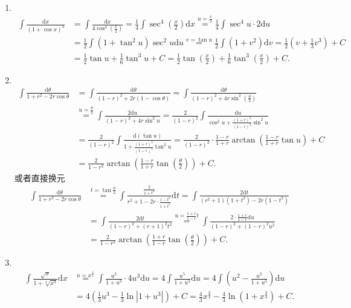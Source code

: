 \begin{solution}
\begin{enumerate}
    \item[35.]\\
    \[
    \begin{aligned}
    \int\frac{\mathrm{d}x}{(1+\cos{x})^2}&=\int\frac{\mathrm{d}x}{4\cos^4{\left(\frac{x}{2}\right)}}=\frac{1}{4}\int\sec^4{\left(\frac{x}{2}\right)}\mathrm{d}x\overset{u=\frac{x}{2}}{=}\frac{1}{4}\int\sec^4{u}\cdot2\mathrm{d}u\\
    &=\frac{1}{2}\int(1+\tan^2{u})\sec^2{u}\mathrm{d}u\overset{v=\tan{u}}{=}\frac{1}{2}\int(1+v^2)\mathrm{d}v=\frac{1}{2}\left(v+\frac{1}{3}v^3\right)+C\\
    &=\frac{1}{2}\tan{u}+\frac{1}{6}\tan^3{u}+C=\frac{1}{2}\tan\left(\frac{x}{2}\right)+\frac{1}{6}\tan^3{\left(\frac{x}{2}\right)}+C.
    \end{aligned}
    \]

    \item[36.]\\
    \[
    \begin{aligned}
    \int\frac{\mathrm{d}\theta}{1+r^2-2r\cos\theta}&=\int\frac{\mathrm{d}\theta}{(1-r)^2+2r(1-\cos\theta)}=\int\frac{\mathrm{d}\theta}{(1-r)^2+4r\sin^2\left(\frac{\theta}{2}\right)}\\
    &\overset{u=\frac{\theta}{2}}{=}\int\frac{2\mathrm{d}u}{(1-r)^2+4r\sin^2{u}}=\frac{2}{(1-r)^2}\int\frac{\mathrm{d}u}{\cos^2{u}+\frac{(1+r)^2}{(1-r)^2}\sin^2u}\\
    &=\frac{2}{(1-r)^2}\int\frac{\mathrm{d}(\tan{u})}{1+\frac{(1+r)^2}{(1-r)^2}\tan^2{u}}=\frac{2}{(1-r)^2}\cdot\frac{1-r}{1+r}\arctan\left(\frac{1-r}{1+r}\tan{u}\right)+C\\
    &=\frac{2}{1-r^2}\arctan\left(\frac{1-r}{1+r}\tan\left(\frac{\theta}{2}\right)\right)+C.
    \end{aligned}
    \]
    或者直接换元
    \[
    \begin{aligned}
    \int\frac{\mathrm{d}\theta}{1+r^2-2r\cos\theta}
    &\overset{t=\tan\frac{\theta}{2}}{=}\int\frac{\frac{2}{1+t^2}}{r^2+1-2r\cdot\frac{1-t^2}{1+t^2}}\mathrm{d}t=\int\frac{2\mathrm{d}t}{(r^2+1)(1+t^2)-2r(1-t^2)}\\
    &=\int\frac{2\mathrm{d}t}{(1-r)^2+(r+1)^2t^2}\overset{u=\frac{1+r}{1-r}t}{=}\int\frac{2\cdot\frac{1+r}{1-r}\mathrm{d}u}{(1-r)^2+(1-r)^2u^2}\\
    &=\frac{2}{1-r^2}\arctan\left( \frac{1+r}{1-r}\tan\left( \frac{\theta}{2} \right) \right)+C.
    \end{aligned}
    \]
    
    \item[37.]\\
    \[
    \begin{aligned}
    \int\frac{\sqrt{x}}{1+\sqrt[4]{x^3}}\mathrm{d}x&\overset{u=x^{\frac{1}{4}}}{=}	\int\frac{u^2}{1+u^3}\cdot4u^3\mathrm{d}u=4\int\frac{u^5}{1+u^3}\mathrm{d}u=4\int\left(u^2-\frac{u^2}{1+u^3}\right)\mathrm{d}u\\
    &=4\left(\frac{1}{3}u^3-\frac{1}{3}\ln\left|1+u^3\right|\right)+C=\frac{4}{3}x^{\frac{3}{4}}-\frac{4}{3}\ln \left(1+x^{\frac{3}{4}}\right)+C.
    \end{aligned}
    \]


\end{enumerate}
\end{solution}
